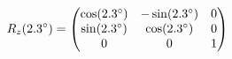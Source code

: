 \documentclass[preview]{standalone}
\begin{document}
\begin{align*}
\special{dvisvgm:raw <g id='unique000'>}R_z(2.3^\circ) = \begin{pmatrix} \cos(2.3^\circ) & -\sin(2.3^\circ) & 0 \\ \sin(2.3^\circ) & \cos(2.3^\circ) & 0 \\ 0 & 0 & 1 \end{pmatrix}\special{dvisvgm:raw </g>}
\end{align*}
\end{document}
